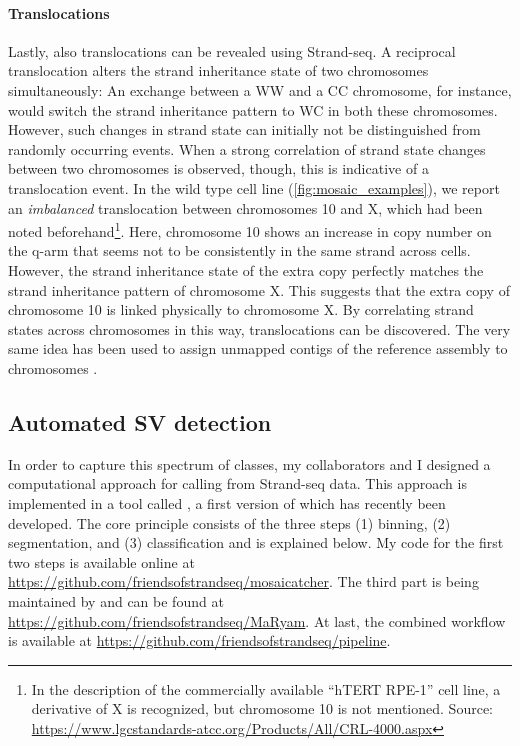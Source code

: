 \paragraph{Translocations}
Lastly, also translocations can be revealed using Strand-seq.  A reciprocal
translocation alters the strand inheritance state of two chromosomes
simultaneously: An exchange between a WW and a CC chromosome, for instance, would switch the
strand inheritance pattern to WC in both these chromosomes. However, such
changes in strand state can initially not be distinguished from randomly
occurring \sce events. When a strong correlation of strand state changes
between two chromosomes is observed, though, this is indicative of a
translocation event. In the  wild
type cell line (\cref{fig:mosaic_examples}), we report an \emph{imbalanced}
translocation between chromosomes 10 and X, which had been noted
beforehand\footnote{In the description of the commercially available
    ``hTERT RPE-1'' cell line, a derivative of X is recognized, but chromosome
    10 is not mentioned. Source: \url{https://www.lgcstandards-atcc.org/Products/All/CRL-4000.aspx}}.
Here, chromosome 10 shows an increase in copy number on the q-arm that seems not
to be consistently in the same strand across cells. However, the strand
inheritance state of the extra copy perfectly matches the strand inheritance
pattern of chromosome X. This suggests that the extra copy of chromosome 10 is
linked physically to chromosome X. By correlating strand states across
chromosomes in this way, translocations can be discovered. The very same idea
has been used to assign unmapped contigs of the reference assembly to
chromosomes \citep{Hills2013}.







\FloatBarrier
\subsection{Automated SV detection}
\label{sec:mosaic_method}

In order to capture this spectrum of \sv classes, my collaborators and I
designed a computational approach for \sv calling from Strand-seq data.
This approach is implemented in a tool called \mc, a first version of which has recently been
developed. The core principle consists of the three steps (1) binning, (2)
segmentation, and (3) classification and is explained below. My code for the
first two steps is available online at
\url{https://github.com/friendsofstrandseq/mosaicatcher}.
The third part is being maintained by \maryam and can be found at
\url{https://github.com/friendsofstrandseq/MaRyam}. At last, the combined
workflow is available at \url{https://github.com/friendsofstrandseq/pipeline}.

